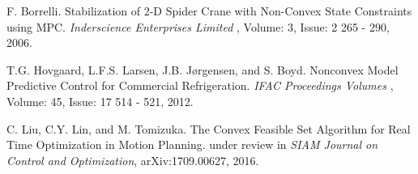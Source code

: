 \documentclass{ifacconf}
\begin{document}
\begin{thebibliography}{xx}
F. Borrelli.
\newblock Stabilization of 2-D Spider Crane with Non-Convex State Constraints using MPC.
\newblock \emph{ Inderscience Enterprises Limited  }, Volume: 3, Issue: 2 265 - 290, 2006.

T.G. Hovgaard, L.F.S. Larsen, J.B. Jørgensen, and S. Boyd.
\newblock Nonconvex Model Predictive Control for Commercial Refrigeration.
\newblock \emph{ IFAC Proceedings Volumes  }, Volume: 45, Issue: 17 514 - 521, 2012.

C. Liu, C.Y. Lin, and M. Tomizuka.
\newblock The Convex Feasible Set Algorithm for Real Time Optimization in Motion Planning.
\newblock under review in \emph{ SIAM Journal on Control and Optimization}, arXiv:1709.00627, 2016.








\end{thebibliography}
\end{document}

